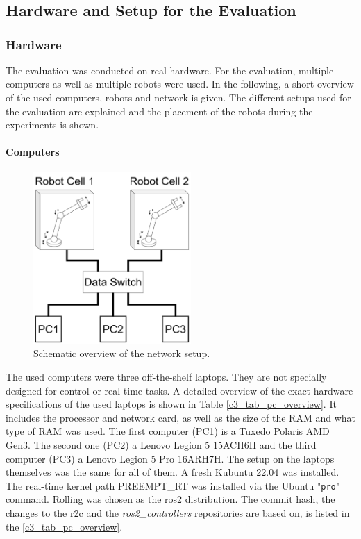 \chapter{}
\label{sec:results}
\section{Hardware and Setup for the Evaluation}\label{c6_sec_setup_all}
\subsection{Hardware}
The evaluation was conducted on real hardware. For the evaluation, multiple computers as well as multiple robots were used. In the following, a short overview of the used computers, robots and network is given. The different setups used for the evaluation are explained and the placement of the robots during the experiments is shown. 

\subsubsection{Computers}
\begin{figure}
\includegraphics[width=6cm]{Figures/c6/network_setup.pdf}
\caption{Schematic overview of the network setup.} \label{c6_fig_network}
\end{figure}
The used computers were three off-the-shelf laptops. They are not specially designed for control or real-time tasks. A detailed overview of the exact hardware specifications of the used laptops is shown in Table \ref{c3_tab_pc_overview}. 
It includes the processor and network card, as well as the size of the RAM and what type of RAM was used. The first computer (PC1) is a Tuxedo Polaris AMD Gen3. The second one (PC2) a Lenovo Legion 5 15ACH6H and the third computer (PC3) a Lenovo Legion 5 Pro 16ARH7H.\newline
The setup on the laptops themselves was the same for all of them. A fresh Kubuntu 22.04 was installed. The real-time kernel path PREEMPT\_RT was installed via the Ubuntu "\texttt{pro}" command. Rolling was chosen as the \gls{ros2} distribution. The commit hash, the changes to the \gls{r2c} and the \textit{ros2\_controllers} repositories are based on, is listed in the \autoref{c3_tab_pc_overview}.

